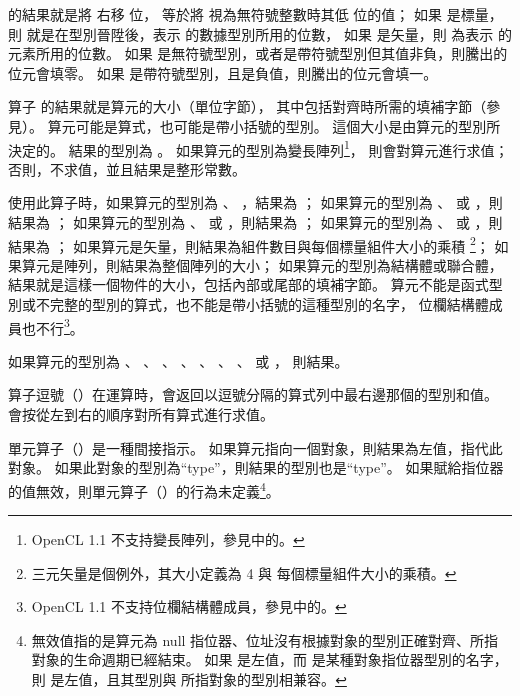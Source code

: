 { 的結果就是將  右移  位，
  等於將  視為無符號整數時其低  位的值；
如果  是標量，則  就是在型別晉陞後，表示  的數據型別所用的位數，
如果  是矢量，則  為表示  的元素所用的位數。
如果  是無符號型別，或者是帶符號型別但其值非負，則騰出的位元會填零。
如果  是帶符號型別，且是負值，則騰出的位元會填一。
\stopitem

\startitem
算子  的結果就是算元的大小（單位字節），
其中包括對齊時所需的填補字節（參見）。
算元可能是算式，也可能是帶小括號的型別。
這個大小是由算元的型別所決定的。
結果的型別為 。
如果算元的型別為變長陣列\footnote{OpenCL 1.1 不支持變長陣列，參見中的。}，
則會對算元進行求值；
否則，不求值，並且結果是整形常數。

使用此算子時，如果算元的型別為 、 ，結果為 ；
如果算元的型別為 、  或 ，則結果為 ；
如果算元的型別為 、  或 ，則結果為 ；
如果算元的型別為 、  或 ，則結果為 ；
如果算元是矢量，則結果為組件數目與每個標量組件大小的乘積
\footnote{三元矢量是個例外，其大小定義為 4 與 每個標量組件大小的乘積。}；
如果算元是陣列，則結果為整個陣列的大小；
如果算元的型別為結構體或聯合體，結果就是這樣一個物件的大小，包括內部或尾部的填補字節。
算元不能是函式型別或不完整的型別的算式，也不能是帶小括號的這種型別的名字，
位欄結構體成員也不行\footnote{OpenCL 1.1 不支持位欄結構體成員，參見中的。}。

如果算元的型別為 、 、 、
 、 、 、
 、  或 ，
則結果。
\stopitem

\startitem
算子逗號（\ccmm{,}）在運算時，會返回以逗號分隔的算式列中最右邊那個的型別和值。
會按從左到右的順序對所有算式進行求值。
\stopitem

\startitem
單元算子（\ccmm{*}）是一種間接指示。
如果算元指向一個對象，則結果為左值，指代此對象。
如果此對象的型別為“type”，則結果的型別也是“type”。
如果賦給指位器的值無效，則單元算子（\ccmm{*}）的行為未定義\footnote{
無效值指的是算元為 null 指位器、位址沒有根據對象的型別正確對齊、所指對象的生命週期已經結束。
如果  是左值，而  是某種對象指位器型別的名字，
則  是左值，且其型別與  所指對象的型別相兼容。
}。
\stopitem

}
